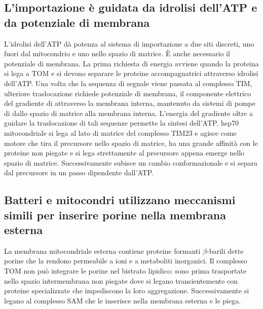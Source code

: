 \subsection{L'importazione \`e guidata da idrolisi dell'ATP e da potenziale di membrana}
L'idrolisi dell'ATP d\`a potenza al sistema di importazione a due siti discreti, uno fuori dal mitocondrio e uno nello spazio di matrice. \`E anche necessario il potenziale di membrana.
La prima richiesta di energia avviene quando la proteina si lega a TOM e si devono separare le proteine accompagnatrici attraverso idrolisi dell'ATP. Una volta che la sequenza di segnale
viene passata al complesso TIM, ulteriore traslocazione richiede potenziale di membrana, il componente elettrico del gradiente di  attraverso la membrana interna, mantenuto
da sistemi di pompe di  dallo spazio di matrice alla membrana interna. L'energia del gradiente oltre a guidare la traslocazione di tali sequenze permette la sintesi dell'ATP.
hsp70 mitocondriale si lega al lato di matrice del complesso TIM23 e agisce come motore che tira il precursore nello spazio di matrice, ha una grande affinit\`a con le proteine non 
piegate e si lega strettamente al precursore appena emerge nello spazio di matrice. Successivamente subisce un cambio conformazionale e si separa dal precursore in un passo dipendente
dall'ATP. 
\subsection{Batteri e mitocondri utilizzano meccanismi simili per inserire porine nella membrana esterna}
La membrana mitocondriale esterna contiene proteine formanti $\beta$-barili dette porine che la rendono permeabile a ioni e a metaboliti inorganici. Il complesso TOM non pu\`o 
integrare  le porine nel bistrato lipidico: sono prima trasportate nello spazio intermembrana non piegate dove si legano transientemente con proteine specializzate che impediscono 
la loro aggregazione. Successivamente si legano al complesso SAM che le inserisce nella membrana esterna e le piega. 
